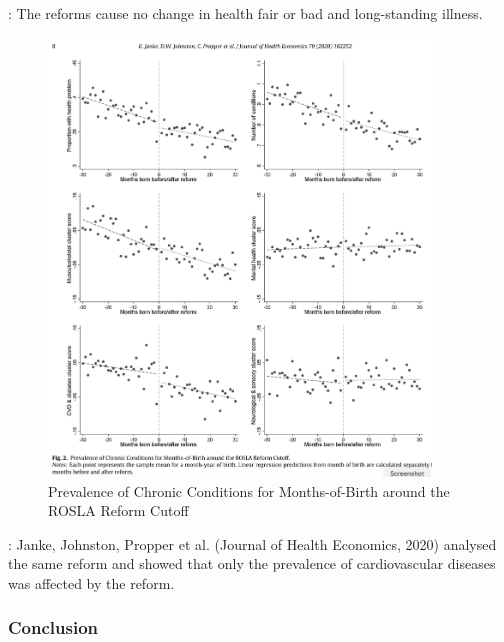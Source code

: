             : The reforms cause no change in health fair or bad and long-standing illness.


            \begin{figure}[H]
                \centering
                \includegraphics[width=4in]{images/ch3/39.png}
                \caption{Prevalence of Chronic Conditions for Months-of-Birth around the ROSLA Reform Cutoff}
                \label{fig:rosla_plot}
            \end{figure} 

            : Janke, Johnston, Propper et al. (Journal of Health Economics, 2020) analysed the same reform and showed that only the prevalence of cardiovascular diseases was affected by the reform.

        \subsubsection{Conclusion}

